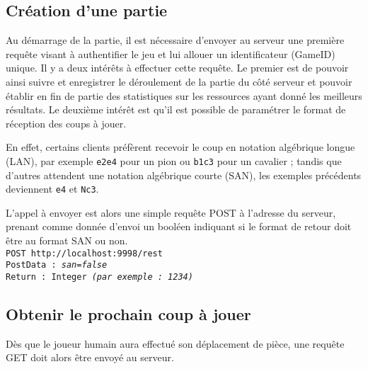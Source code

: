 \documentclass[a4paper,11pt]{article}
\begin{document}
\subsection{Création d'une partie}
Au démarrage de la partie, il est nécessaire d'envoyer au serveur une première requête visant à authentifier le jeu et lui allouer un identificateur (GameID) unique.
Il y a deux intérêts à effectuer cette requête.
Le premier est de pouvoir ainsi suivre et enregistrer le déroulement de la partie du côté serveur et pouvoir établir en fin de partie des statistiques sur les ressources ayant donné les meilleurs résultats.
Le deuxième intérêt est qu'il est possible de paramétrer le format de réception des coups à jouer.

En effet, certains clients préfèrent recevoir le coup en notation algébrique longue (LAN), par exemple {\tt e2e4} pour un pion ou {\tt b1c3} pour un cavalier ;
tandis que d'autres attendent une notation algébrique courte (SAN), les exemples précédents deviennent {\tt e4} et {\tt Nc3}.



L'appel à envoyer est alors une simple requête POST à l'adresse du serveur, prenant comme donnée d'envoi un booléen indiquant si le format de retour doit être au format SAN ou non.
\\{\tt POST http://localhost:9998/rest\\
PostData : {\em san=false}\\
Return : Integer {\em (par exemple : 1234)} }\\


\subsection{Obtenir le prochain coup à jouer}
Dès que le joueur humain aura effectué son déplacement de pièce, une requête GET doit alors être envoyé au serveur.
\end{document}
